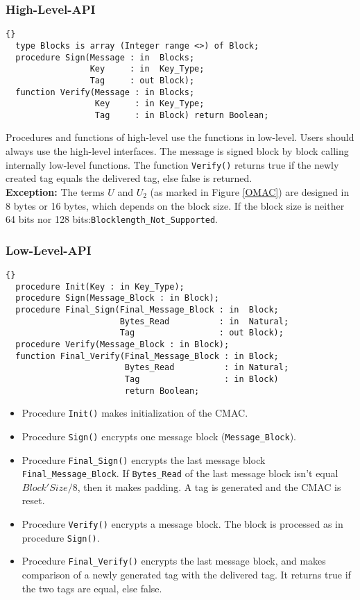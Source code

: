 \subsubsection*{High-Level-API}
\begin{lstlisting}{}
  type Blocks is array (Integer range <>) of Block;
  procedure Sign(Message : in  Blocks;
                 Key     : in  Key_Type;
                 Tag     : out Block);
  function Verify(Message : in Blocks;
                  Key     : in Key_Type;
                  Tag     : in Block) return Boolean;
\end{lstlisting}
Procedures and functions of high-level use the functions in low-level. Users should always use the high-level interfaces. The message is signed block by block calling internally low-level functions. The function \texttt{Verify()} returns true if the newly created tag equals the delivered tag, else false is returned.\\
\textbf{Exception:} The terms $U$ and $U_2$ (as marked in Figure \ref{OMAC}) are designed in 8 bytes or 16 bytes, which depends on the block size. If the block size is neither 64 bits nor 128 bits:\quad\texttt{Blocklength\_Not\_Supported}.\\
\subsubsection*{Low-Level-API}
\begin{lstlisting}{}
  procedure Init(Key : in Key_Type);
  procedure Sign(Message_Block : in Block);
  procedure Final_Sign(Final_Message_Block : in  Block;
                       Bytes_Read          : in  Natural;
                       Tag                 : out Block);
  procedure Verify(Message_Block : in Block);
  function Final_Verify(Final_Message_Block : in Block;
                        Bytes_Read          : in Natural;
                        Tag                 : in Block)
                        return Boolean;
\end{lstlisting}
\begin{itemize}
\item Procedure \texttt{Init()} makes initialization of the CMAC.
\item Procedure \texttt{Sign()} encrypts one message block (\texttt{Message\_Block}).
\item Procedure \texttt{Final\_Sign()} encrypts the last message block \texttt{Final\_Message\_Block}. If \texttt{Bytes\_Read} of the last message block isn't equal $Block'Size/8$, then it makes padding. A tag is generated and the CMAC is reset.
\item Procedure \texttt{Verify()} encrypts a message block. The block is processed as in procedure \texttt{Sign()}.
\item Procedure \texttt{Final\_Verify()} encrypts the last message block, and makes comparison of a newly generated tag with the delivered tag. It returns true if the two tags are equal, else false.
\end{itemize}
